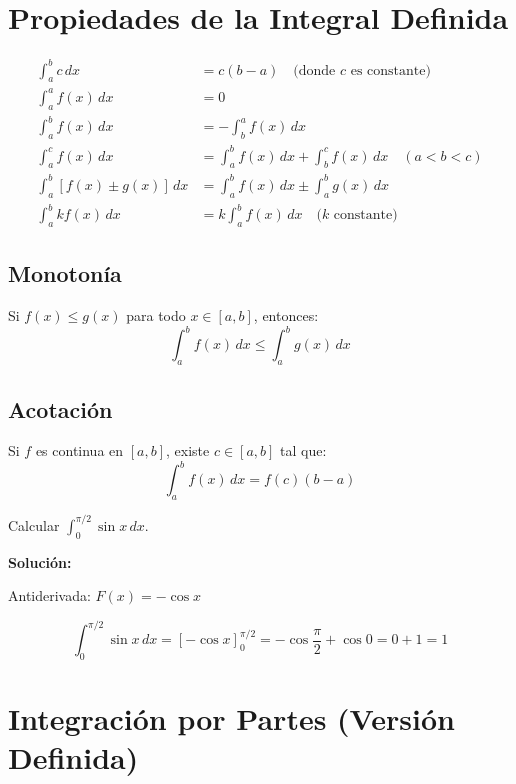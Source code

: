 \documentclass[12pt, a4paper]{book}
\begin{document}
\section{Propiedades de la Integral Definida}

\begin{proposicion}
\begin{align}
\int_a^b c \, dx &= c(b-a) \quad \text{(donde $c$ es constante)} \\
\int_a^a f(x) \, dx &= 0 \\
\int_a^b f(x) \, dx &= -\int_b^a f(x) \, dx \\
\int_a^c f(x) \, dx &= \int_a^b f(x) \, dx + \int_b^c f(x) \, dx \quad (a < b < c) \\
\int_a^b [f(x) \pm g(x)] \, dx &= \int_a^b f(x) \, dx \pm \int_a^b g(x) \, dx \\
\int_a^b k f(x) \, dx &= k \int_a^b f(x) \, dx \quad \text{($k$ constante)}
\end{align}
\end{proposicion}

\subsection{Monotonía}

\begin{proposicion}
Si $f(x) \leq g(x)$ para todo $x \in [a,b]$, entonces:
\[
\int_a^b f(x) \, dx \leq \int_a^b g(x) \, dx
\]
\end{proposicion}

\subsection{Acotación}

\begin{proposicion}
Si $f$ es continua en $[a,b]$, existe $c \in [a,b]$ tal que:
\[
\int_a^b f(x) \, dx = f(c)(b-a)
\]
\end{proposicion}

\begin{ejemplo}
Calcular $\int_0^{\pi/2} \sin x \, dx$.

\textbf{Solución:}

Antiderivada: $F(x) = -\cos x$

\[
\int_0^{\pi/2} \sin x \, dx = [-\cos x]_0^{\pi/2} = -\cos\frac{\pi}{2} + \cos 0 = 0 + 1 = 1
\]
\end{ejemplo}

\section{Integración por Partes (Versión Definida)}
\end{document}

